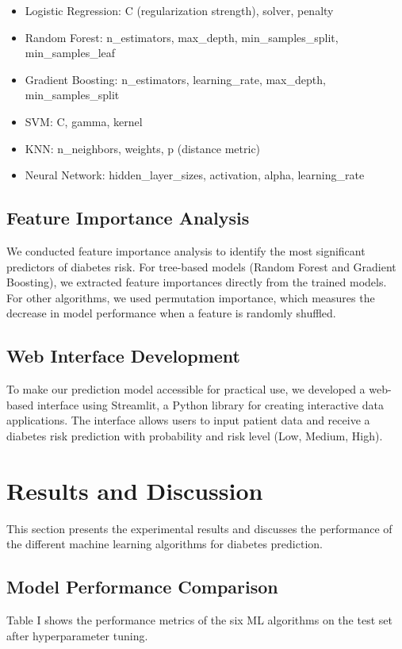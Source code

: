 \documentclass[conference]{IEEEtran}
\begin{document}
\begin{itemize}
\begin{itemize}
    \item Logistic Regression: C (regularization strength), solver, penalty
    \item Random Forest: n\_estimators, max\_depth, min\_samples\_split, min\_samples\_leaf
    \item Gradient Boosting: n\_estimators, learning\_rate, max\_depth, min\_samples\_split
    \item SVM: C, gamma, kernel
    \item KNN: n\_neighbors, weights, p (distance metric)
    \item Neural Network: hidden\_layer\_sizes, activation, alpha, learning\_rate
\end{itemize}

\subsection{Feature Importance Analysis}
We conducted feature importance analysis to identify the most significant predictors of diabetes risk. For tree-based models (Random Forest and Gradient Boosting), we extracted feature importances directly from the trained models. For other algorithms, we used permutation importance, which measures the decrease in model performance when a feature is randomly shuffled.

\subsection{Web Interface Development}
To make our prediction model accessible for practical use, we developed a web-based interface using Streamlit, a Python library for creating interactive data applications. The interface allows users to input patient data and receive a diabetes risk prediction with probability and risk level (Low, Medium, High).

\section{Results and Discussion}
This section presents the experimental results and discusses the performance of the different machine learning algorithms for diabetes prediction.

\subsection{Model Performance Comparison}
Table I shows the performance metrics of the six ML algorithms on the test set after hyperparameter tuning.


\end{itemize}
\end{document}
